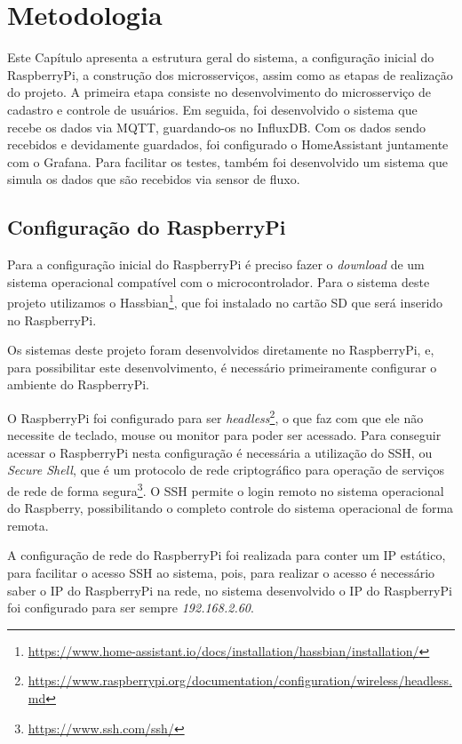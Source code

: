 \chapter{Metodologia}

Este Capítulo apresenta a estrutura geral do sistema, a configuração inicial do RaspberryPi, a construção dos microsserviços, assim como as etapas de realização do projeto. A
primeira etapa consiste no desenvolvimento do microsserviço de cadastro e controle de usuários. Em seguida, foi desenvolvido o sistema que recebe os dados via MQTT, guardando-os no InfluxDB. Com os dados sendo recebidos e devidamente guardados, foi configurado o HomeAssistant juntamente com o Grafana. Para facilitar os testes, também foi desenvolvido um sistema que simula os dados que são recebidos via sensor de fluxo.

\section{Configuração do RaspberryPi}

Para a configuração inicial do RaspberryPi é preciso fazer o \textit{download} de um sistema operacional compatível com o microcontrolador. Para o sistema deste projeto utilizamos o Hassbian\footnote{\url{https://www.home-assistant.io/docs/installation/hassbian/installation/}}, que foi instalado no cartão SD que será inserido no RaspberryPi.


Os sistemas deste projeto foram desenvolvidos diretamente no RaspberryPi, e, para possibilitar este desenvolvimento, é necessário primeiramente configurar o ambiente do RaspberryPi.

O RaspberryPi foi configurado para ser \textit{headless}\footnote{\url{https://www.raspberrypi.org/documentation/configuration/wireless/headless.md}}, o que faz com que ele não necessite de teclado, mouse ou monitor para poder ser acessado. Para conseguir acessar o RaspberryPi nesta configuração é necessária a utilização do SSH, ou \textit{Secure Shell}, que é um protocolo de rede criptográfico para operação de serviços de rede de forma segura\footnote{\url{https://www.ssh.com/ssh/}}. O SSH permite o login remoto no sistema operacional do Raspberry, possibilitando o completo controle do sistema operacional de forma remota.

A configuração de rede do RaspberryPi foi realizada para conter um IP estático, para facilitar o acesso SSH ao sistema, pois, para realizar o acesso é necessário saber o IP do RaspberryPi na rede, no sistema desenvolvido o IP do RaspberryPi foi configurado para ser sempre \textit{192.168.2.60}.


